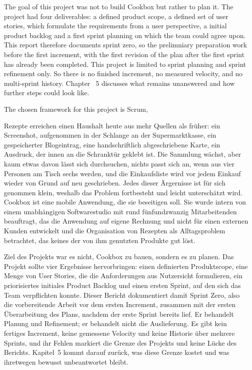 The goal of this project was not to build Cookbox but rather to plan it. The project had four deliverables: a defined product scope, a defined set of user stories, which formulate the requirements from a user perspective, a initial product backlog and a first sprint planning on which the team could agree upon. This report therefore documents sprint zero, so the prelimniary preparation work before the first increment, with the first revision of the plan after the first sprint has already been completed. This project is limited to sprint planning and sprint refinement only. So there is no finished increment, no measured velocity, and no multi-sprint history.  Chapter ~5 discusses what remains unanswered and how further steps could look like.

The chosen framework for this project is Scrum, 

Rezepte erreichen einen Haushalt heute aus mehr Quellen als früher: ein Screenshot, aufgenommen in der Schlange an der Supermarktkasse, ein gespeicherter Blogeintrag, eine handschriftlich abgeschriebene Karte, ein Ausdruck, der innen an die Schranktür geklebt ist. Die Sammlung wächst, aber kaum etwas davon lässt sich durchsuchen, nichts passt sich an, wenn aus vier Personen am Tisch sechs werden, und die Einkaufsliste wird vor jedem Einkauf wieder von Grund auf neu geschrieben. Jedes dieser Ärgernisse ist für sich genommen klein, weshalb das Problem fortbesteht und leicht unterschätzt wird. Cookbox ist eine mobile Anwendung, die sie beseitigen soll. Sie wurde intern von einem unabhängigen Softwarestudio mit rund fünfundzwanzig Mitarbeitenden beauftragt, das die Anwendung auf eigene Rechnung und nicht für einen externen Kunden entwickelt und die Organisation von Rezepten als Alltagsproblem betrachtet, das keines der von ihm genutzten Produkte gut löst.

Ziel des Projekts war es nicht, Cookbox zu bauen, sondern es zu planen. Das Projekt sollte vier Ergebnisse hervorbringen: einen definierten Produktscope, eine Menge von User Stories, die die Anforderungen aus Nutzersicht formulieren, ein priorisiertes initiales Product Backlog und einen ersten Sprint, auf den sich das Team verpflichten konnte. Dieser Bericht dokumentiert damit Sprint Zero, also die vorbereitende Arbeit vor dem ersten Increment, zusammen mit der ersten Überarbeitung des Plans, nachdem der erste Sprint bereits lief. Er behandelt Planung und Refinement; er behandelt nicht die Auslieferung. Es gibt kein fertiges Increment, keine gemessene Velocity und keine Historie über mehrere Sprints, und ihr Fehlen markiert die Grenze des Projekts und keine Lücke des Berichts. Kapitel~5 kommt darauf zurück, was diese Grenze kostet und was ihretwegen bewusst unbeantwortet bleibt.

